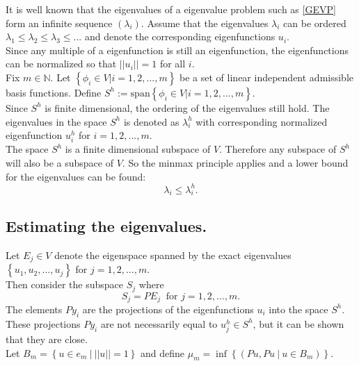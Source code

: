 \documentclass[../../main.tex]{subfiles}
\begin{document}
It is well known that the eigenvalues of a eigenvalue problem such as \eqref{GEVP} form an infinite sequence $(\lambda_i)$. Assume that the eigenvalues $\lambda_i$ can be ordered $\lambda_1 \leq \lambda_2 \leq \lambda_3 \leq ...$ and denote the corresponding eigenfunctions $u_i$.\\

Since any multiple of a eigenfunction is still an eigenfunction, the eigenfunctions can be normalized so that $||u_i|| = 1$ for all $i$.\\

Fix $m \in \mathbb{N}$. Let $\left\{ \phi_i \in V | i = 1,2,...,m \right\}$ be a set of linear independent admissible basis functions. Define $S^h := \text{span}\left\{\phi_i \in V | i = 1,2,...,m\right\}$.\\

Since $S^h$ is finite dimensional, the ordering of the eigenvalues still hold. The eigenvalues in the space $S^h$ is denoted as $\lambda_i^h$ with corresponding normalized eigenfunction $u^h_i$ for $i = 1,2,...,m$.\\

The space $S^h$ is a finite dimensional subspace of $V$. Therefore any subspace of $S^h$ will also be a subspace of $V$. So the minmax principle applies and a lower bound for the eigenvalues can be found:
\begin{equation}
	\lambda_i \leq \lambda_i^h.
\end{equation}


\subsection{Estimating the eigenvalues.}
Let $E_j \in V$ denote the eigenspace spanned by the exact eigenvalues $\left\{u_1,u_2,...,u_j \right\}$ for $j = 1,2,...,m$.\\

Then consider the subspace $S_j$ where
\begin{equation*}
	S_j = PE_j \ \text{ for } j = 1,2,...,m.
\end{equation*} The elements $Py_i$ are the projections of the eigenfunctions $u_i$ into the space $S^h$. These projections $Py_i$ are not necessarily equal to $u^h_j \in S^h$, but it can be shown that they are close.\\

Let $B_m = \left\{u \in e_m \ | \ ||u|| = 1 \right\}$ and define $\mu_m = \inf\left\{(Pu,Pu \ | \ u \in B_m)\right\}$.\\
\end{document}
